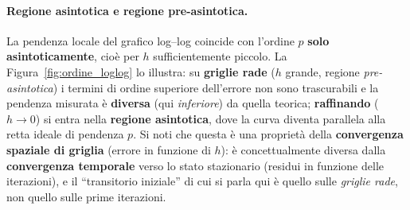 \paragraph{Regione asintotica e regione pre-asintotica.}
La pendenza locale del grafico log--log coincide con l'ordine $p$ \textbf{solo asintoticamente}, cioè
per $h$ sufficientemente piccolo. La Figura~\ref{fig:ordine_loglog} lo illustra: su \textbf{griglie
rade} ($h$ grande, regione \emph{pre-asintotica}) i termini di ordine superiore dell'errore non sono
trascurabili e la pendenza misurata è \textbf{diversa} (qui \emph{inferiore}) da quella teorica;
\textbf{raffinando} ($h\to0$) si entra nella \textbf{regione asintotica}, dove la curva diventa
parallela alla retta ideale di pendenza $p$. Si noti che questa è una proprietà della
\textbf{convergenza spaziale di griglia} (errore in funzione di $h$): è concettualmente diversa dalla
\textbf{convergenza temporale} verso lo stato stazionario (residui in funzione delle iterazioni),
e il ``transitorio iniziale'' di cui si parla qui è quello sulle \emph{griglie rade}, non quello
sulle prime iterazioni.

